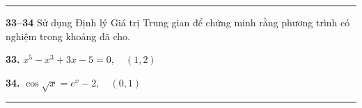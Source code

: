 \begin{minipage}[t]{0.485\textwidth}
{\color{stewartcyan}\rule{\linewidth}{0.6pt}}\par
\vspace{1.5mm}

{\bfseries\sffamily\color{stewartcyan}33--34}\; Sử dụng Định lý Giá trị Trung gian để chứng minh rằng phương trình có nghiệm trong khoảng đã cho.\par
\vspace{1.5mm}
\textbf{33.} $x^5 - x^3 + 3x - 5 = 0, \quad (1, 2)$\par
\vspace{1.5mm}
\textbf{34.} $\cos\sqrt{x} = e^x - 2, \quad (0, 1)$\par
\vspace{1.5mm}
{\color{stewartcyan}\rule{\linewidth}{0.6pt}}
\end{minipage}
